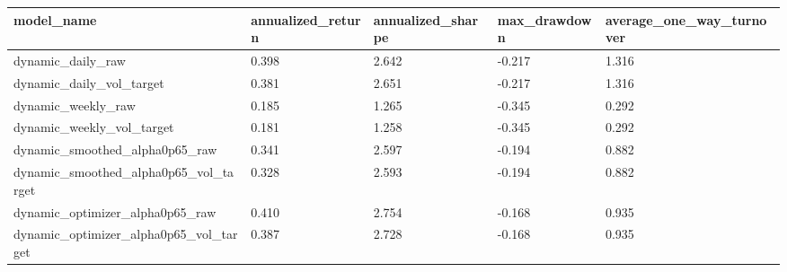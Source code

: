 \begin{tabular}{lllll}
\toprule
model\_name & annualized\_return & annualized\_sharpe & max\_drawdown & average\_one\_way\_turnover \\
\midrule
dynamic\_daily\_raw & 0.398 & 2.642 & -0.217 & 1.316 \\
dynamic\_daily\_vol\_target & 0.381 & 2.651 & -0.217 & 1.316 \\
dynamic\_weekly\_raw & 0.185 & 1.265 & -0.345 & 0.292 \\
dynamic\_weekly\_vol\_target & 0.181 & 1.258 & -0.345 & 0.292 \\
dynamic\_smoothed\_alpha0p65\_raw & 0.341 & 2.597 & -0.194 & 0.882 \\
dynamic\_smoothed\_alpha0p65\_vol\_target & 0.328 & 2.593 & -0.194 & 0.882 \\
dynamic\_optimizer\_alpha0p65\_raw & 0.410 & 2.754 & -0.168 & 0.935 \\
dynamic\_optimizer\_alpha0p65\_vol\_target & 0.387 & 2.728 & -0.168 & 0.935 \\
\bottomrule
\end{tabular}
